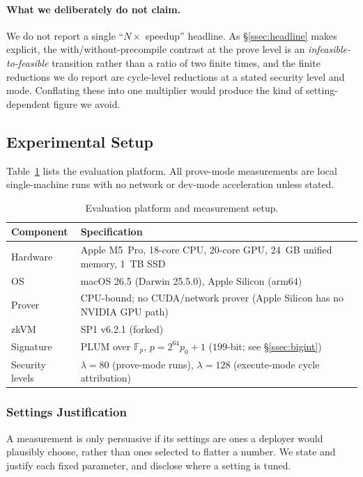 \paragraph{What we deliberately do not claim.}
We do not report a single ``$N\times$ speedup'' headline. As \S\ref{ssec:headline} makes explicit, the with/without-precompile contrast at the prove level is an \emph{infeasible-to-feasible} transition rather than a ratio of two finite times, and the finite reductions we do report are cycle-level reductions at a stated security level and mode. Conflating these into one multiplier would produce the kind of setting-dependent figure we avoid.

\subsection{Experimental Setup}\label{ssec:setup}
Table~\ref{tab:platform} lists the evaluation platform. All prove-mode measurements are local single-machine runs with no network or dev-mode acceleration unless stated.

\begin{table}[H]
\centering
\small
\begin{tabular}{ll}
\toprule
Component & Specification \\
\midrule
Hardware & Apple M5~Pro, 18-core CPU, 20-core GPU, 24~GB unified memory, 1~TB SSD \\
OS & macOS 26.5 (Darwin 25.5.0), Apple Silicon (arm64) \\
Prover & CPU-bound; no CUDA/network prover (Apple Silicon has no NVIDIA GPU path) \\
zkVM & SP1 v6.2.1 (forked) \\
Signature & PLUM over $\mathbb{F}_p$, $p=2^{64}p_0+1$ ($199$-bit; see \S\ref{ssec:bigint}) \\
Security levels & $\lambda=80$ (prove-mode runs), $\lambda=128$ (execute-mode cycle attribution) \\
\bottomrule
\end{tabular}
\caption{Evaluation platform and measurement setup.}
\label{tab:platform}
\end{table}

\subsubsection{Settings Justification}\label{ssec:settings-justify}
A measurement is only persuasive if its settings are ones a deployer would plausibly choose, rather than ones selected to flatter a number. We state and justify each fixed parameter, and disclose where a setting is tuned.

